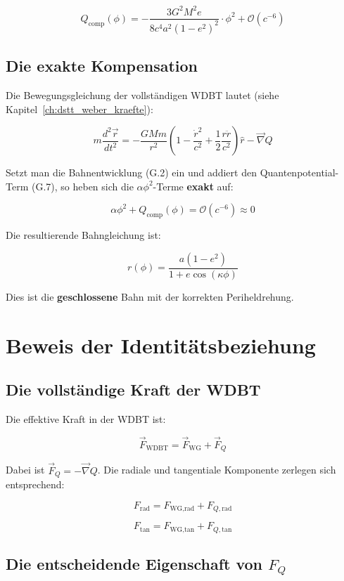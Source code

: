 \[
Q_{\text{comp}}(\phi) = -\frac{3G^2M^2 e}{8c^4 a^2(1-e^2)^2} \cdot \phi^2 + \mathcal{O}(c^{-6})
\tag{G.7}
\]

\subsection{Die exakte Kompensation}
\label{sub:identitaet_exakte_kompensation}

Die Bewegungsgleichung der vollständigen WDBT lautet (siehe Kapitel~\ref{ch:dstt_weber_kraefte}):

\[
m \frac{d^2\vec{r}}{dt^2} = -\frac{GMm}{r^2} \left( 1 - \frac{\dot{r}^2}{c^2} + \frac{1}{2}\frac{r\ddot{r}}{c^2} \right) \hat{r} - \vec{\nabla} Q
\tag{G.8}
\]

Setzt man die Bahnentwicklung (G.2) ein und addiert den Quantenpotential-Term (G.7), so heben sich die \(\alpha\phi^2\)-Terme \textbf{exakt} auf:

\[
\alpha\phi^2 + Q_{\text{comp}}(\phi) = \mathcal{O}(c^{-6}) \approx 0
\tag{G.9}
\]

Die resultierende Bahngleichung ist:

\[
r(\phi) = \frac{a(1 - e^2)}{1 + e \cos(\kappa\phi)}
\tag{G.10}
\]

Dies ist die \textbf{geschlossene} Bahn mit der korrekten Periheldrehung.

\section{Beweis der Identitätsbeziehung}
\label{app:identitaet_beweis}

\subsection{Die vollständige Kraft der WDBT}
\label{sub:identitaet_vollstaendige_kraft}

Die effektive Kraft in der WDBT ist:

\[
\vec{F}_{\text{WDBT}} = \vec{F}_{\text{WG}} + \vec{F}_Q
\tag{G.11}
\]

Dabei ist \(\vec{F}_Q = -\vec{\nabla} Q\). Die radiale und tangentiale Komponente zerlegen sich entsprechend:

\[
F_{\text{rad}} = F_{\text{WG,rad}} + F_{Q,\text{rad}}
\tag{G.12}
\]

\[
F_{\text{tan}} = F_{\text{WG,tan}} + F_{Q,\text{tan}}
\tag{G.13}
\]

\subsection{Die entscheidende Eigenschaft von \(F_Q\)}
\label{sub:identitaet_fq_eigenschaft}

